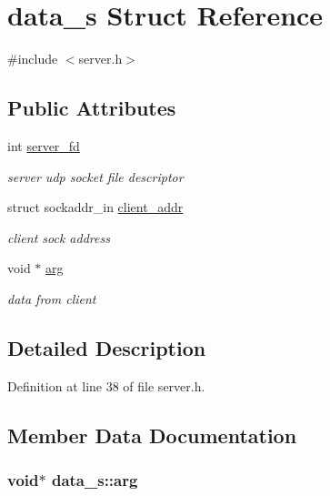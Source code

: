 \hypertarget{structdata__s}{\section{data\-\_\-s Struct Reference}
\label{structdata__s}
}


{\ttfamily \#include $<$server.\-h$>$}

\subsection*{Public Attributes}
\begin{DoxyCompactItemize}
\item 
int \hyperlink{structdata__s_a78aaeb875fb9670cbeb1269fee39dd40}{server\-\_\-fd}
\begin{DoxyCompactList}\small\item\em server udp socket file descriptor \end{DoxyCompactList}\item 
struct sockaddr\-\_\-in \hyperlink{structdata__s_a51ad65b735ac28716f75a66677dec9bb}{client\-\_\-addr}
\begin{DoxyCompactList}\small\item\em client sock address \end{DoxyCompactList}\item 
void $\ast$ \hyperlink{structdata__s_a6c608061e789454befad6d618b4ef8f6}{arg}
\begin{DoxyCompactList}\small\item\em data from client \end{DoxyCompactList}\end{DoxyCompactItemize}


\subsection{Detailed Description}


Definition at line 38 of file server.\-h.



\subsection{Member Data Documentation}
\hypertarget{structdata__s_a6c608061e789454befad6d618b4ef8f6}{
\subsubsection[{arg}]{\setlength{\rightskip}{0pt plus 5cm}void$\ast$ data\-\_\-s\-::arg}}\label{structdata__s_a6c608061e789454befad6d618b4ef8f6}


